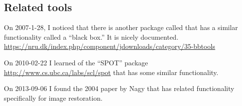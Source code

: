 
\subsection{Related tools}

\blist
\item
On 2007-1-28,
I noticed that there is another package called 
that has a similar functionality called a ``black box.''
It is nicely documented.
\\
\url{https://nru.dk/index.php/component/jdownloads/category/35-bbtools}

\item
On 2010-02-22 I learned of the ``SPOT'' package
\url{http://www.cs.ubc.ca/labs/scl/spot}
that has some similar functionality.

\item
On 2013-09-06
I found the 2004 paper by Nagy \etal
\cite{nagy:04:imf}
that has related functionality
specifically for image restoration.

\elist

